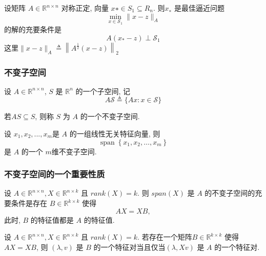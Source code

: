 \documentclass[12pt,a4paper]{article}
\begin{document}
\begin{framed}
	\begin{corollary}
	设矩阵 $A ∈ \mathbb{R}^{n×n}$ 对称正定, 向量 $x∗ ∈ S_1 ⊆ R_n.$ 则$ x_∗$ 是最佳逼近问题
	$$
	\min _{x \in \mathcal{S}_{1}}\|x-z\|_{A}
	$$
	的解的充要条件是
	$$
	A\left(x_{*}-z\right) \perp \mathcal{S}_{1}
	$$
	这里$\|x-z\|_{A} \triangleq\left\|A^{\frac{1}{2}}(x-z)\right\|_{2}$
	\end{corollary}
\end{framed}

\subsubsection{不变子空间}
设 $A ∈ \mathbb{R}^{n×n}$, $S$ 是 $\mathbb{R}^n$ 的一个子空间, 记
$$
A \mathcal{S} \triangleq\{A x : x \in \mathcal{S}\}
$$
\begin{framed}
	\begin{definition}
	 若$ AS ⊆ S$, 则称 $S$ 为 $A$ 的一个不变子空间.	
	\end{definition}
\end{framed}

\begin{framed}
	\begin{theorem}
	设 $x_1, x_2, . . . , x_m $是 $A$ 的一组线性无关特征向量, 则
	$$
	\operatorname{span}\left\{x_{1}, x_{2}, \ldots, x_{m}\right\}
	$$
	是 $A$ 的一个 $m $维不变子空间.
	\end{theorem}
\end{framed}


\subsubsection{不变子空间的一个重要性质}
\begin{framed}
	\begin{theorem}
		设 $A ∈ \mathbb{R}^{n×n}, X ∈ \mathbb{R}^{n×k}$ 且 $rank(X) = k$. 则 $span(X)$ 是 $A$ 的不变子空间的充要条件是存在 $B ∈ \mathbb{R}^{k×k}$ 使得
		$$AX = XB,$$
		此时, $B$ 的特征值都是 $A$ 的特征值. 
	\end{theorem}
\end{framed}

\begin{framed}
	\begin{corollary}
		设 $A ∈ \mathbb{R}^{n×n}, X ∈ \mathbb{R}^{n×k}$ 且 $rank(X) = k$. 若存在一个矩阵$B ∈ \mathbb{R}^{k×k}$ 使得 $AX = XB$, 则 $(λ, v)$ 是 $B$ 的一个特征对当且仅当$(λ, Xv)$ 是 $A$ 的一个特征对.
	\end{corollary}
\end{framed}
\end{document}
